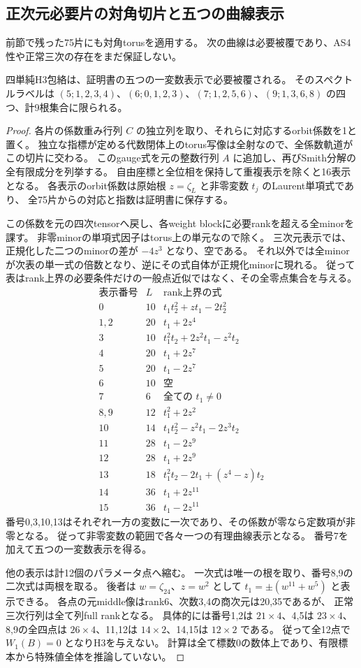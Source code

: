 \subsection{正次元必要片の対角切片と五つの曲線表示}
\label{subsec:cubic-four-simple-positive-rank}
前節で残った75片にも対角torusを適用する。
次の曲線は必要被覆であり、AS4性や正常三次の存在をまだ保証しない。
\begin{proposition}\label{prop:cubic-four-simple-five-curves}
四単純H3包絡は、証明書の五つの一変数表示で必要被覆される。
そのスペクトルラベルは
$(5;1,2,3,4)$、$(6;0,1,2,3)$、$(7;1,2,5,6)$、$(9;1,3,6,8)$
の四つ、計9根集合に限られる。
\end{proposition}
\begin{proof}
各片の係数重み行列 $C$ の独立列を取り、それらに対応するorbit係数を1と置く。
独立な指標が定める代数閉体上のtorus写像は全射なので、全係数軌道がこの切片に交わる。
このgauge式を元の整数行列 $A$ に追加し、再びSmith分解の全有限成分を列挙する。
自由座標と全位相を保持して重複表示を除くと16表示となる。
各表示のorbit係数は原始根 $z=\zeta_L$ と非零変数 $t_j$ のLaurent単項式であり、
全75片からの対応と指数は証明書に保存する。

この係数を元の四次tensorへ戻し、各weight blockに必要rankを超える全minorを課す。
非零minorの単項式因子はtorus上の単元なので除く。
三次元表示では、正規化した二つのminorの差が $-4z^3$ となり、空である。
それ以外では全minorが次表の単一式の倍数となり、逆にその式自体が正規化minorに現れる。
従って表はrank上界の必要条件だけの一般点近似ではなく、その全零点集合を与える。
\[
\begin{array}{c|r|l}
\text{表示番号}&L&\text{rank上界の式}\\\hline
0&10&t_1t_2^2+zt_1-2t_2^2\\
1,2&20&t_1+2z^4\\
3&10&t_1^2t_2+2z^2t_1-z^2t_2\\
4&20&t_1+2z^7\\
5&20&t_1-2z^7\\
6&10&\text{空}\\
7&6&\text{全ての }t_1\ne0\\
8,9&12&t_1^2+2z^2\\
10&14&t_1t_2^2-z^2t_1-2z^3t_2\\
11&28&t_1-2z^9\\
12&28&t_1+2z^9\\
13&18&t_1^2t_2-2t_1+(z^4-z)t_2\\
14&36&t_1+2z^{11}\\
15&36&t_1-2z^{11}
\end{array}
\]
番号0,3,10,13はそれぞれ一方の変数に一次であり、その係数が零なら定数項が非零となる。
従って非零変数の範囲で各々一つの有理曲線表示となる。
番号7を加えて五つの一変数表示を得る。

他の表示は計12個のパラメータ点へ縮む。
一次式は唯一の根を取り、番号8,9の二次式は両根を取る。
後者は $w=\zeta_{24}$、$z=w^2$ として
$t_1=\pm(w^{11}+w^5)$ と表示できる。
各点の元middle像はrank6、次数3,4の商次元は20,35であるが、
正常三次行列は全て列full rankとなる。
具体的には番号1,2は $21\times4$、4,5は $23\times4$、
8,9の全四点は $26\times4$、11,12は $14\times2$、14,15は $12\times2$ である。
従って全12点で $W_1(B)=0$ となりH3を与えない。
計算は全て標数0の数体上であり、有限標本から特殊値全体を推論していない。
\end{proof}
